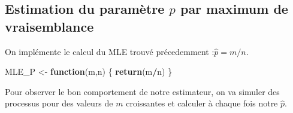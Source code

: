 \documentclass[
]{article}
\newenvironment{Shaded}{\begin{snugshade}}{\end{snugshade}}
\newcommand{\AttributeTok}[1]{\textcolor[rgb]{0.13,0.29,0.53}{#1}}
\newcommand{\ControlFlowTok}[1]{\textcolor[rgb]{0.13,0.29,0.53}{\textbf{#1}}}
\newcommand{\DecValTok}[1]{\textcolor[rgb]{0.00,0.00,0.81}{#1}}
\newcommand{\FloatTok}[1]{\textcolor[rgb]{0.00,0.00,0.81}{#1}}
\newcommand{\FunctionTok}[1]{\textcolor[rgb]{0.13,0.29,0.53}{\textbf{#1}}}
\newcommand{\NormalTok}[1]{#1}
\newcommand{\OtherTok}[1]{\textcolor[rgb]{0.56,0.35,0.01}{#1}}
\newcommand{\SpecialCharTok}[1]{\textcolor[rgb]{0.81,0.36,0.00}{\textbf{#1}}}
\newcommand{\StringTok}[1]{\textcolor[rgb]{0.31,0.60,0.02}{#1}}
\begin{document}
\subsection{\texorpdfstring{Estimation du paramètre \(p\) par maximum de
vraisemblance}{Estimation du paramètre p par maximum de vraisemblance}}\label{estimation-du-paramuxe8tre-p-par-maximum-de-vraisemblance}

On implémente le calcul du MLE trouvé précedemment :\(\hat p=m/n\).

\begin{Shaded}
\begin{Highlighting}[]
\NormalTok{MLE\_P }\OtherTok{\textless{}{-}} \ControlFlowTok{function}\NormalTok{(m,n)}
\NormalTok{\{}
  \FunctionTok{return}\NormalTok{(m}\SpecialCharTok{/}\NormalTok{n)}
\NormalTok{\}}
\end{Highlighting}
\end{Shaded}

Pour observer le bon comportement de notre estimateur, on va simuler des
processus pour des valeurs de \(m\) croissantes et calculer à chaque
fois notre \(\hat p\).

\begin{Shaded}
\end{Shaded}
\end{document}
